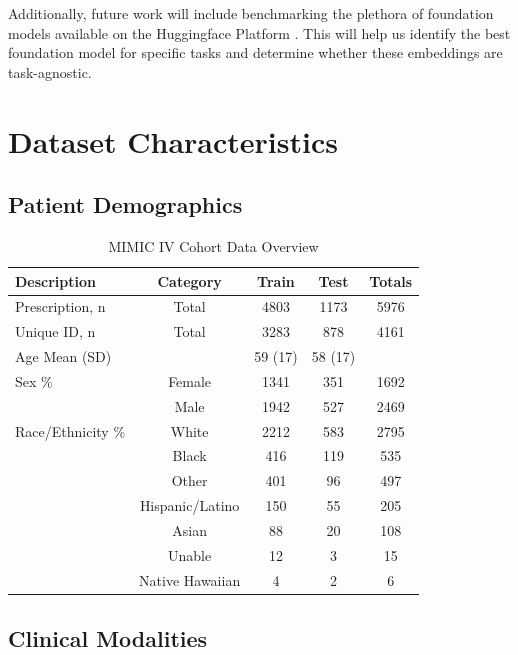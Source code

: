 \documentclass{article}
\theoremstyle{plain}
\theoremstyle{definition}
\theoremstyle{remark}
\begin{document}
Additionally, future work will include benchmarking the plethora of foundation models available on the Huggingface Platform \cite{wolf2019huggingface}. This will help us identify the best foundation model for specific tasks and determine whether these embeddings are task-agnostic.

\section{Dataset Characteristics}
\label{demo}

\subsection{Patient Demographics}

\begin{table}[h!]
\caption{MIMIC IV Cohort Data Overview}
\label{mimic-iv-table}
\vskip 0.15in
\begin{center}
\begin{small}
\begin{sc}
\begin{tabular}{lcccc}
\toprule
Description & Category & Train & Test & Totals \\
\midrule
Prescription, n & Total & 4803 & 1173 & 5976 \\
Unique ID, n & Total & 3283 & 878 & 4161 \\
Age Mean (SD) & & 59 (17) & 58 (17) & \\
Sex \% & Female & 1341 & 351 & 1692 \\
& Male & 1942 & 527 & 2469 \\
Race/Ethnicity \% & White & 2212 & 583 & 2795 \\
& Black & 416 & 119 & 535 \\
& Other & 401 & 96 & 497 \\
& Hispanic/Latino & 150 & 55 & 205 \\
& Asian & 88 & 20 & 108 \\
& Unable & 12 & 3 & 15 \\
& Native Hawaiian & 4 & 2 & 6 \\
\bottomrule
\end{tabular}
\end{sc}
\end{small}
\end{center}
\vskip -0.1in
\end{table}

\subsection{Clinical Modalities}
\end{document}
